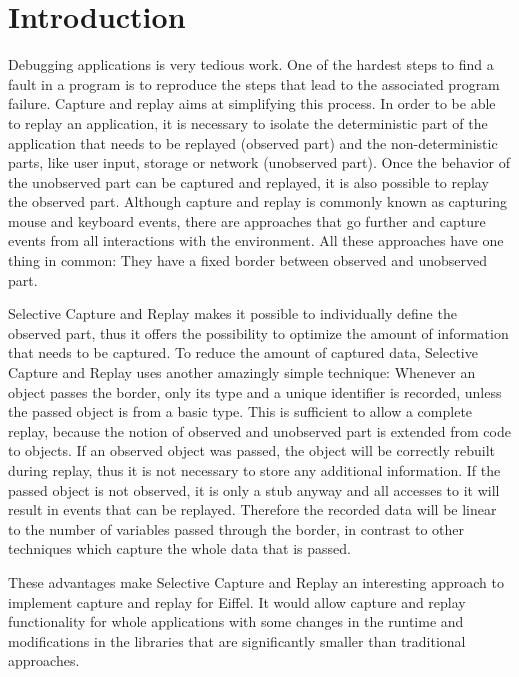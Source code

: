 \chapter{Introduction}
Debugging applications is very tedious work. One of the hardest steps to find a fault in a program is to reproduce the steps that lead to the associated program failure. Capture and replay aims at simplifying this process. In order to be able to replay an application, it is necessary to isolate the deterministic part of the application that needs to be replayed (observed part) and the non-deterministic parts, like user input, storage or network (unobserved part). Once the behavior of the unobserved part can be captured and replayed, it is also possible to replay the observed part. Although capture and replay is commonly known as capturing mouse and keyboard events, there are approaches that go further and capture events from all interactions with the environment. All these approaches have one thing in common: They have a fixed border between observed and unobserved part.

Selective Capture and Replay \cite{orso05may} makes it possible to individually define the observed part, thus it offers the possibility to optimize the amount of information that needs to be captured. To reduce the amount of captured data, Selective Capture and Replay uses another amazingly simple technique: Whenever an object passes the border, only its type and a unique identifier is recorded, unless the passed object is from a basic type. This is sufficient to allow a complete replay, because the notion of observed and unobserved part is extended from code to objects. If an observed object was passed, the object will be correctly rebuilt during replay, thus it is not necessary to store any additional information. If the passed object is not observed, it is only a stub anyway and all accesses to it will result in events that can be replayed. Therefore the recorded data will be linear to the number of variables passed through the border, in contrast to other techniques which capture the whole data that is passed.

These advantages make Selective Capture and Replay an interesting approach to implement capture and replay for Eiffel. It would allow capture and replay functionality for whole applications with some changes in the runtime and modifications in the libraries that are significantly smaller than traditional approaches.

